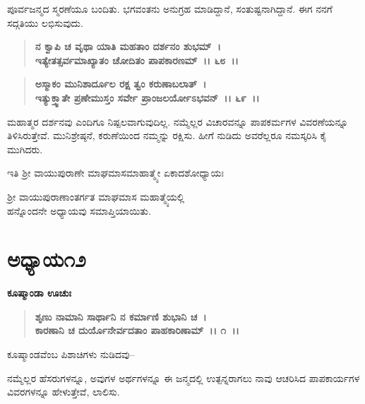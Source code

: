 ಪೂರ್ವಜನ್ಮದ ಸ್ಮರಣೆಯೂ ಬಂದಿತು. ಭಗವಂತನು ಅನುಗ್ರಹ ಮಾಡಿದ್ದಾನೆ, ಸಂತುಷ್ಟನಾಗಿದ್ದಾನೆ. ಈಗ ನನಗೆ ಸದ್ಗತಿಯು ಲಭಿಸುವುದು.

\begin{verse}
\textbf{ನ ಕ್ವಾಪಿ ಚ ವೃಥಾ ಯಾತಿ ಮಹತಾಂ ದರ್ಶನಂ ಶುಭಮ್~।}\\\textbf{ಇತ್ಯೇತತ್ಸರ್ವಮಾಖ್ಯಾತಂ ಚೋದಿತಂ ಪಾಪಕಾರಣಮ್~।। ೬೮~।।} 
\end{verse}

\begin{verse}
\textbf{ಅಸ್ಮಾಕಂ ಮುನಿಶಾರ್ದೂಲ ರಕ್ಷ ತ್ವಂ ಕರುಣಾಬಲಾತ್~।}\\\textbf{ಇತ್ಯುಕ್ತ್ವಾತೇ ಪ್ರಣೇಮುಸ್ತಂ ಸರ್ವೇ ಪ್ರಾಂಜಲರ್ಯೋಽಭವನ್~।। ೬೯~।।}
\end{verse}

ಮಹಾತ್ಮರ ದರ್ಶನವು ಎಂದಿಗೂ ನಿಷ್ಪಲವಾಗುವುದಿಲ್ಲ. ನಮ್ಮೆಲ್ಲರ ವಿಚಾರವನ್ನೂ ಪಾಪಕರ್ಮಗಳ ವಿವರಣೆಯನ್ನೂ ತಿಳಿಸಿರುತ್ತೇವೆ. ಮುನಿಶ್ರೇಷ್ಠನೆ, ಕರುಣೆಯಿಂದ ನಮ್ಮನ್ನು ರಕ್ಷಿಸು. ಹೀಗೆ ನುಡಿದು ಅವರೆಲ್ಲರೂ ನಮಸ್ಕರಿಸಿ ಕೈ ಮುಗಿದರು.

\begin{center}
ಇತಿ ಶ‍್ರೀ ವಾಯುಪುರಾಣೇ ಮಾಘಮಾಸಮಾಹಾತ್ಮ್ಯೇ ಏಕಾದಶೋಧ್ಯಾಯಃ 
\end{center}

\begin{center}
ಶ‍್ರೀ ವಾಯುಪುರಾಣಾಂತರ್ಗತ ಮಾಘಮಾಸ ಮಹಾತ್ಮ್ಯೆಯಲ್ಲಿ \\ ಹನ್ನೊಂದನೇ ಅಧ್ಯಾಯವು ಸಮಾಪ್ತಿಯಾಯಿತು.
\end{center}

\newpage

\section*{ಅಧ್ಯಾಯ೧೨}

\emptypage

\begin{flushleft}
\textbf{ಕೂಷ್ಮಾಂಡಾ ಊಚುಃ}
\end{flushleft}

\begin{verse}
\textbf{ಶೃಣು ನಾಮಾನಿ ಸಾರ್ಥಾನಿ ನ ಕರ್ಮಾಣಿ ಶುಭಾನಿ ಚ~।}\\\textbf{ಕಾರಣಾನಿ ಚ ದುರ್ಯೊನೇರ್ವದತಾಂ ಪಾಹಕಾರಿಣಾಮ್~।। ೧~।। }
\end{verse}

\begin{flushleft}
ಕೂಷ್ಮಾಂಡವೆಂಬ ಪಿಶಾಚಿಗಳು ನುಡಿದವು–
\end{flushleft}

ನಮ್ಮೆಲ್ಲರ ಹೆಸರುಗಳನ್ನೂ, ಅವುಗಳ ಅರ್ಥಗಳನ್ನೂ ಈ ಜನ್ಮದಲ್ಲಿ ಉತ್ಪನ್ನರಾಗಲು ನಾವು ಆಚರಿಸಿದ ಪಾಪಕಾರ್ಯಗಳ ವಿವರಗಳನ್ನೂ ಹೇಳುತ್ತೇವೆ, ಲಾಲಿಸು.

